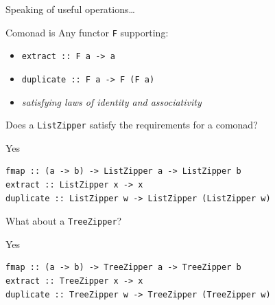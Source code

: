 \begin{frame}
\begin{center}
Speaking of useful operations\ldots
\end{center}
\end{frame}

\begin{frame}
\begin{block}{Comonad is}
Any functor \lstinline{F} supporting:
\begin{center}
\begin{itemize}
  \item<1-> \lstinline{extract :: F a -> a}
  \item<2-> \lstinline{duplicate :: F a -> F (F a)}
  \item<3-> \emph{satisfying laws of identity and associativity}
\end{itemize}
\end{center}
\end{block}
\end{frame}

\begin{frame}
\begin{center}
Does a \lstinline{ListZipper} satisfy the requirements for a comonad?
\end{center}
\end{frame}

\begin{frame}[fragile]
\begin{block}{Yes}
\begin{center}
\begin{lstlisting}[style=haskell]
fmap :: (a -> b) -> ListZipper a -> ListZipper b
extract :: ListZipper x -> x
duplicate :: ListZipper w -> ListZipper (ListZipper w)
\end{lstlisting}
\end{center}
\end{block}
\end{frame}

\begin{frame}
\begin{center}
What about a \lstinline{TreeZipper}?
\end{center}
\end{frame}

\begin{frame}[fragile]
\begin{block}{Yes}
\begin{center}
\begin{lstlisting}[style=haskell]
fmap :: (a -> b) -> TreeZipper a -> TreeZipper b
extract :: TreeZipper x -> x
duplicate :: TreeZipper w -> TreeZipper (TreeZipper w)
\end{lstlisting}
\end{center}
\end{block}
\end{frame}

